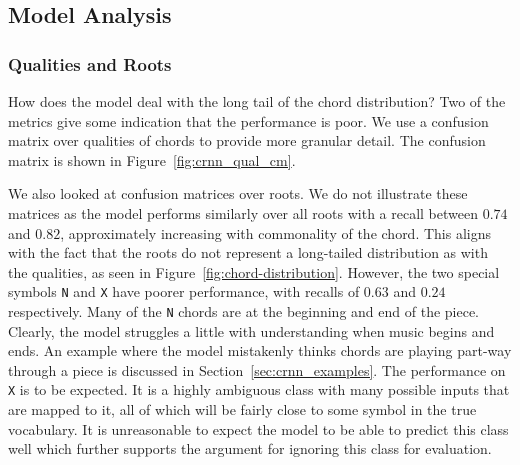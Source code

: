 \subsection{Model Analysis}

\subsubsection{Qualities and Roots}

How does the model deal with the long tail of the chord distribution? Two of the metrics give some indication that the performance is poor. We use a confusion matrix over qualities of chords to provide more granular detail. The confusion matrix is shown in Figure~\ref{fig:crnn_qual_cm}. 

We also looked at confusion matrices over roots. We do not illustrate these matrices as the model performs similarly over all roots with a recall between $0.74$ and $0.82$, approximately increasing with commonality of the chord. This aligns with the fact that the roots do not represent a long-tailed distribution as with the qualities, as seen in Figure~\ref{fig:chord-distribution}. However, the two special symbols \texttt{N} and \texttt{X} have poorer performance, with recalls of $0.63$ and $0.24$ respectively. Many of the \texttt{N} chords are at the beginning and end of the piece. Clearly, the model struggles a little with understanding when music begins and ends. An example where the model mistakenly thinks chords are playing part-way through a piece is discussed in Section~\ref{sec:crnn_examples}. The performance on \texttt{X} is to be expected. It is a highly ambiguous class with many possible inputs that are mapped to it, all of which will be fairly close to some symbol in the true vocabulary. It is unreasonable to expect the model to be able to predict this class well which further supports the argument for ignoring this class for evaluation.

